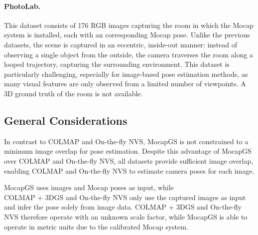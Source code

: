 \documentclass[a4paper,fleqn]{cas-dc}
\begin{document}
\paragraph{PhotoLab.} 
This dataset consists of 176 RGB images capturing the room in which the Mocap system is installed, each with an corresponding Mocap pose. Unlike the previous datasets, the scene is captured in an eccentric, inside-out manner: instead of observing a single object from the outside, the camera traverses the room along a looped trajectory, capturing the surrounding environment. This dataset is particularly challenging, especially for image-based pose estimation methods, as many visual features are only observed from a limited number of viewpoints. A 3D ground truth of the room is not available.

\subsection{General Considerations}
In contrast to COLMAP and On-the-fly NVS, MocapGS is not constrained to a minimum image overlap for pose estimation. Despite this advantage of MocapGS over COLMAP and On-the-fly NVS, all datasets provide sufficient image overlap, enabling COLMAP and On-the-fly NVS to estimate camera poses for each image.

MocapGS uses images and Mocap poses as input, while \\COLMAP + 3DGS and On-the-fly NVS only use the captured images as input and infer the pose solely from image data. COLMAP + 3DGS and On-the-fly NVS therefore operate with an unknown scale factor, while MocapGS is able to operate in metric units due to the calibrated Mocap system.
\end{document}
